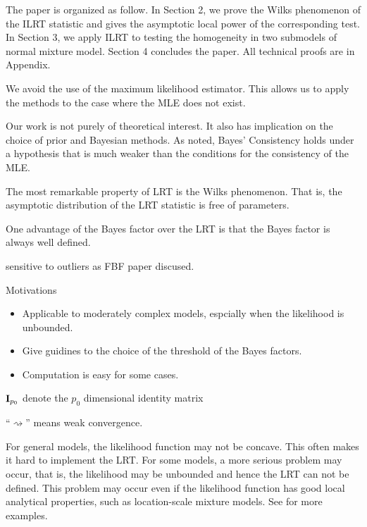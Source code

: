\documentclass[11pt]{article}
\theoremstyle{plain}
\theoremstyle{definition}
\theoremstyle{remark}
\begin{document}
The paper is organized as follow.
In Section 2, we prove the Wilks phenomenon of the ILRT statistic and gives the asymptotic local power of the corresponding test.
In Section 3, we apply ILRT to testing the homogeneity in two submodels of normal mixture model.
Section 4 concludes the paper.
All technical proofs are in Appendix.


We avoid the use of the maximum likelihood estimator.
This allows us to apply the methods to the case where the MLE does not exist.


Our work is not purely of theoretical interest.
It also has implication on the choice of prior and Bayesian methods.
As \cite{clarke1990information} noted, Bayes' Consistency holds under a hypothesis that is much weaker than the conditions for the consistency of the MLE.

The most remarkable property of LRT is the Wilks phenomenon. That is, the asymptotic distribution of the LRT statistic is free of parameters.

One advantage of the Bayes factor over the LRT is that the Bayes factor is always well defined.

sensitive to outliers as FBF paper discused.


Motivations
\begin{itemize}
    \item 
        Applicable to moderately complex models, espcially when the likelihood is unbounded.
    \item
        Give guidines to the choice of the threshold of the Bayes factors.
    \item
        Computation is easy for some cases.
\end{itemize}




 $\mathbf{I}_{p_0}$ denote the $p_0$ dimensional identity matrix

``$\rightsquigarrow$'' means weak convergence.


For general models, the likelihood function may not be concave.
This often makes it hard to implement the LRT.
For some models, a more serious problem may occur, that is, the likelihood may be unbounded and hence the LRT can not be defined.
This problem may occur even if the likelihood function has good local analytical properties, such as location-scale mixture models.  See \cite{Cam1990Maximum} for more examples.
\end{document}
